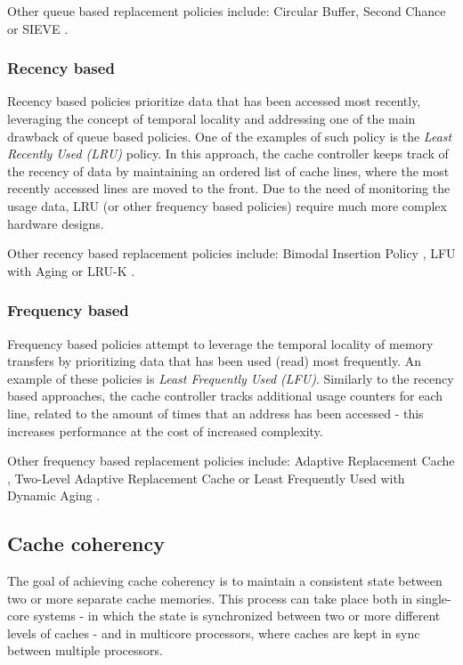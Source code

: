 \vspace{10px}\noindent Other queue based replacement policies include: Circular Buffer, Second Chance or SIEVE \cite{fifo2}.

\subsubsection{Recency based}
Recency based policies prioritize data that has been accessed most recently, leveraging the concept of temporal locality and addressing one of
the main drawback of queue based policies. One of the examples of such policy is the \textit{Least Recently Used (LRU)} policy. In this approach, the cache controller
keeps track of the recency of data by maintaining an ordered list of cache lines, where the most recently accessed lines are moved to the front. Due to the need of monitoring
the usage data, LRU (or other frequency based policies) require much more complex hardware designs. 

\vspace{10px}\noindent Other recency based replacement policies include: Bimodal Insertion Policy \cite{bip}, LFU with Aging or LRU-K \cite{eviction_summary}.

\subsubsection{Frequency based}
Frequency based policies attempt to leverage the temporal locality of memory transfers by prioritizing data that has been used (read) most frequently.
An example of these policies is \textit{Least Frequently Used (LFU)}. Similarly to the recency based approaches, the cache controller tracks additional usage counters
for each line, related to the amount of times that an address has been accessed - this increases performance at the cost of increased complexity.

\vspace{10px}\noindent Other frequency based replacement policies include: Adaptive Replacement Cache \cite{arc1}, Two-Level Adaptive Replacement Cache \cite{twoleveladaptive} or Least Frequently Used with Dynamic Aging \cite{jayarekha2010adaptive}.

\subsection{Cache coherency}

The goal of achieving cache coherency is to maintain a consistent state between two or
more separate cache memories. This process can take place both in single-core
systems - in which the state is synchronized between two or more different levels of caches
- and in multicore processors, where caches are kept in sync between multiple
processors.


